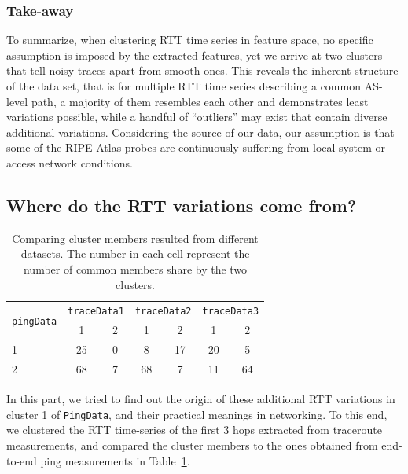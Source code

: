 \subsubsection*{Take-away}
To summarize, when clustering RTT time series in feature space, no specific assumption is imposed by the extracted features, yet we arrive at two clusters that tell noisy traces apart from smooth ones.
This reveals the inherent structure of the data set, that is for multiple RTT time series describing a common AS-level path, a majority of them resembles each other and demonstrates least variations possible, while a handful of ``outliers'' may exist that contain diverse additional variations. 
Considering the source of our data, our assumption is that some of the RIPE Atlas probes are continuously suffering from local system or access network conditions. 

\subsection{Where do the RTT variations come from?}

\begin{table}[!htb]
\centering
\footnotesize
\setlength{\tabcolsep}{0.5em}
\begin{tabular}{l|cc|cc|cc}
\toprule
\multirow{2}{*}{\texttt{pingData}} & \multicolumn{2}{c|}{\texttt{traceData1}} & \multicolumn{2}{c|}{\texttt{traceData2}} & \multicolumn{2}{c}{\texttt{traceData3}}\\
 &  1 & 2 & 1 & 2 & 1 & 2\\
\midrule
1 & 25 & 0 & 8 & 17 & 20 & 5 \\
2 & 68 & 7 & 68 & 7 & 11 & 64 \\
\bottomrule
\end{tabular}
\caption{Comparing cluster members resulted from different datasets. The number in each cell represent the number of common members share by the two clusters.}
\label{tab:comp_cls}
\end{table}

In this part, we tried to find out the origin of these additional RTT variations in cluster 1 of \texttt{PingData}, and their practical meanings in networking.
To this end, we clustered the RTT time-series of the first 3 hops extracted from traceroute measurements, and compared the cluster members to the ones obtained from end-to-end ping measurements in Table~\ref{tab:comp_cls}.

